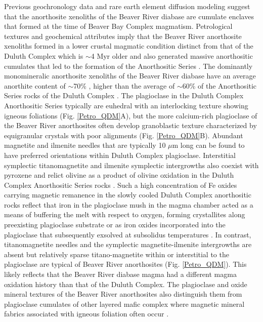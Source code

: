 \documentclass[9pt,twocolumn,twoside,lineno]{pnas-new}
\begin{document}
Previous geochronology data and rare earth element diffusion modeling suggest that the anorthosite xenoliths of the Beaver River diabase are cumulate enclaves that formed at the time of Beaver Bay Complex magmatism. Petrological textures and geochemical attributes imply that the Beaver River anorthosite xenoliths formed in a lower crustal magmatic condition distinct from that of the Duluth Complex which is $\sim$4 Myr older and also generated massive anorthositic cumulates that led to the formation of the Anorthositic Series \cite{Zhang2021b, Swanson-Hysell2021a}. The dominantly monomineralic anorthosite xenoliths of the Beaver River diabase have an average anorthite content of $\sim$70\% \cite{Morrison1983a, Doyle2016a}, higher than the average of $\sim$60\% of the Anorthositic Series rocks of the Duluth Complex \cite{Miller1990a}. The plagioclase in the Duluth Complex Anorthositic Series typically are euhedral with an interlocking texture showing igneous foliations (Fig. \ref{Petro_QDM}A), but the more calcium-rich plagioclase of the Beaver River anorthosites often develop granoblastic texture characterized by equigranular crystals with poor alignments (Fig. \ref{Petro_QDM}B). Abundant magnetite and ilmenite needles that are typically 10 $\mu$m long can be found to have preferred orientations within Duluth Complex plagioclase. Interstitial symplectic titanomagnetite and ilmenite symplectic intergrowths also coexist with pyroxene and relict olivine as a product of olivine oxidation in the Duluth Complex Anorthositic Series rocks \cite{Miller1990a}. Such a high concentration of Fe oxides carrying magnetic remanence in the slowly cooled Duluth Complex anorthositic rocks reflect that iron in the plagioclase mush in the magma chamber acted as a means of buffering the melt with respect to oxygen, forming crystallites along preexisting plagioclase substrate or as iron oxides incorporated into the plagioclase that subsequently exsolved at subsolidus temperatures \cite{Scofield1986a}. In contrast, titanomagnetite needles and the symplectic magnetite-ilmenite intergrowths are absent but relatively sparse titano-magnetite within or interstitial to the plagioclase are typical of Beaver River anorthosites (Fig. \ref{Petro_QDM}). This likely reflects that the Beaver River diabase magma had a different magma oxidation history than that of the Duluth Complex. The plagioclase and oxide mineral textures of the Beaver River anorthosites also distinguish them from plagioclase cumulates of other layered mafic complex where magnetic mineral fabrics associated with igneous foliation often occur \cite{Scofield1986a, Selkin2000a, Feinberg2006a}. 
\end{document}
